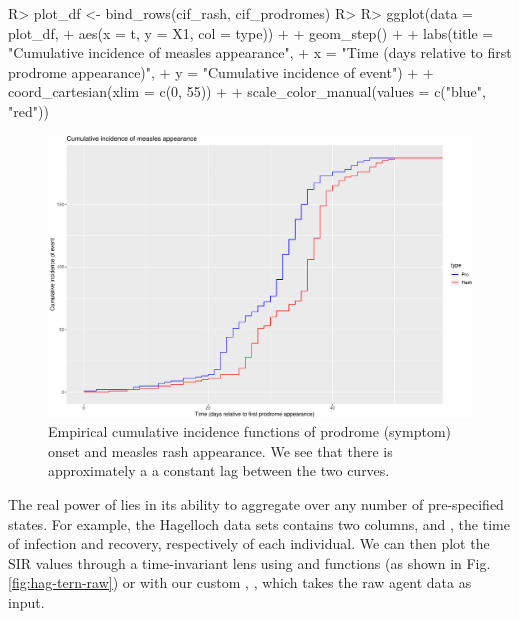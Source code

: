 \documentclass[
  shortnames]{jss}
\begin{document}
\begin{CodeChunk}
\begin{CodeInput}
R> plot_df <- bind_rows(cif_rash, cif_prodromes)
R> 
R> ggplot(data = plot_df,
+        aes(x = t, y = X1, col = type)) + 
+   geom_step() + 
+   labs(title = "Cumulative incidence of measles appearance",
+        x = "Time (days relative to first prodrome appearance)",
+        y = "Cumulative incidence of event") + 
+   coord_cartesian(xlim = c(0, 55)) +
+   scale_color_manual(values = c("blue", "red"))
\end{CodeInput}
\begin{figure}[H]

{\centering \includegraphics{Figs/unnamed-chunk-7-1} 

}

\caption{\label{fig:cifs}Empirical cumulative incidence functions of prodrome (symptom) onset and measles rash appearance.  We see that there is approximately a a constant lag between the two curves.}\label{fig:unnamed-chunk-7}
\end{figure}
\end{CodeChunk}

The real power of  lies in its ability to
aggregate over any number of pre-specified states. For example, the
Hagelloch data sets contains two columns,  and , the
time of infection and recovery, respectively of each individual. We can
then plot the SIR values through a time-invariant lens using
 and  functions (as shown in Fig.
\ref{fig:hag-tern-raw}) or with our custom ,
, which takes the raw agent data as input.
\end{document}
